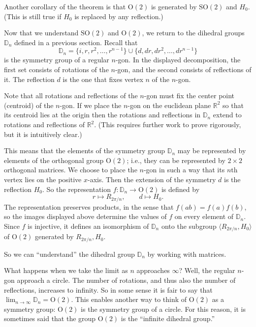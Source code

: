 \documentclass[11pt]{article}
\theoremstyle{definition}
\newcommand{\R}{\mathbb{R}} %
\newcommand{\gen}[1]{\langle #1 \rangle}
\newcommand{\Orth}{\mathrm{O}}
\newcommand{\SO}{\mathrm{SO}}
\newcommand{\D}{\mathbb{D}}
\begin{document}
Another corollary of the theorem is that $\Orth(2)$ is generated by
$\SO(2)$ and $H_0$. (This is still true if $H_0$ is replaced by any
reflection.)

Now that we understand $\SO(2)$ and $\Orth(2)$, we return to the
dihedral groups $\D_n$ defined in a previous section. Recall that
\[
  \D_n = \{i, r, r^2, \dots, r^{n-1} \} \cup \{d, dr, dr^2, \dots,
  dr^{n-1} \}
\]
is the symmetry group of a regular $n$-gon. In the displayed
decomposition, the first set consists of rotations of the $n$-gon, and
the second consists of reflections of it. The reflection $d$ is the
one that fixes vertex $n$ of the $n$-gon.  

Note that all rotations and reflections of the $n$-gon must fix the
center point (centroid) of the $n$-gon. If we place the $n$-gon on the
euclidean plane $\R^2$ so that its centroid lies at the origin then
the rotations and reflections in $\D_n$ extend to rotations and
reflections of $\R^2$. (This requires further work to prove
rigorously, but it is intuitively clear.)

This means that the elements of the symmetry group $\D_n$ may be
represented by elements of the orthogonal group $\Orth(2)$; i.e., they
can be represented by $2 \times 2$ orthogonal matrices.  We choose to
place the $n$-gon in such a way that its $n$th vertex lies on the
positive $x$-axis. Then the extension of the symmetry $d$ is the
reflection $H_0$.  So the representation $f: \D_n \to \Orth(2)$ is
defined by
\[
  r \mapsto R_{2\pi/n}, \qquad d \mapsto H_0.
\]
The representation preserves products, in the sense that $f(ab) =
f(a)f(b)$, so the images displayed above determine the values of $f$
on every element of $\D_n$. Since $f$ is injective, it defines an
isomorphism of $\D_n$ onto the subgroup $\gen{R_{2\pi/n}, H_0}$ of
$\Orth(2)$ generated by $R_{2\pi/n}, H_0$.

So we can ``understand'' the dihedral group $\D_{n}$ by working with
matrices. 

What happens when we take the limit as $n$ approaches $\infty$? Well,
the regular $n$-gon approach a circle. The number of rotations, and
thus also the number of reflections, increases to infinity. So in some
sense it is fair to say that $\lim_{n \to \infty} \D_n =
\Orth(2)$. This enables another way to think of $\Orth(2)$ as a
symmetry group: $\Orth(2)$ is the symmetry group of a circle.  For
this reason, it is sometimes said that the group $\Orth(2)$ is the
``infinite dihedral group.''
\end{document}

